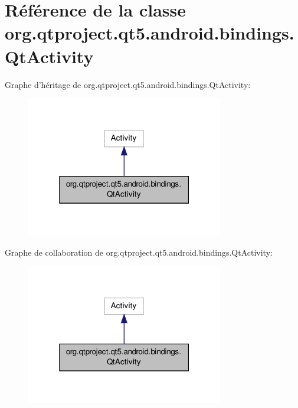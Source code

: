 \hypertarget{classorg_1_1qtproject_1_1qt5_1_1android_1_1bindings_1_1_qt_activity}{\section{Référence de la classe org.\-qtproject.\-qt5.\-android.\-bindings.\-Qt\-Activity}
\label{classorg_1_1qtproject_1_1qt5_1_1android_1_1bindings_1_1_qt_activity}
}


Graphe d'héritage de org.\-qtproject.\-qt5.\-android.\-bindings.\-Qt\-Activity\-:\nopagebreak
\begin{figure}[H]
\begin{center}
\leavevmode
\includegraphics[width=244pt]{classorg_1_1qtproject_1_1qt5_1_1android_1_1bindings_1_1_qt_activity__inherit__graph}
\end{center}
\end{figure}


Graphe de collaboration de org.\-qtproject.\-qt5.\-android.\-bindings.\-Qt\-Activity\-:\nopagebreak
\begin{figure}[H]
\begin{center}
\leavevmode
\includegraphics[width=244pt]{classorg_1_1qtproject_1_1qt5_1_1android_1_1bindings_1_1_qt_activity__coll__graph}
\end{center}
\end{figure}

